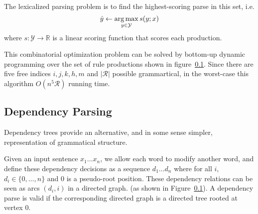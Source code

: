 \documentclass[11pt,letterpaper]{article}
\DeclareMathOperator*{\argmax}{arg\,max}
\newcommand{\nonterms}{\mathcal{N}}
\newcommand{\rules}{\mathcal{R}}
\newcommand{\terms}{\mathcal{T}}
\newcommand{\Span}[1]{\langle #1 \rangle}
\newcommand{\Reals}{\mathbb{R}}
\begin{document}



The lexicalized parsing problem is to find the highest-scoring parse in this set, i.e.  \[ \hat{y} \gets \argmax_{y \in {\cal Y}} s(y;x) \] where
$s: \mathcal{Y} \rightarrow \Reals$ is a linear scoring function that scores each production.

This combinatorial optimization problem can be solved by bottom-up dynamic
programming over the set of rule productions shown in figure~\ref{}.
Since there are five free indices $i, j,  k, h, m$ and $|\rules|$ possible grammartical, in the worst-case this algorithm
 $O(n^5 \rules)$ running time.












\subsection{Dependency Parsing}

Dependency trees provide an alternative, and in some sense simpler,
representation of grammatical structure.

Given an input sentence $x_1
\ldots x_n$, we allow each word to modify another word,  and define these dependency decisions as a sequence $d_1 \ldots d_n$ where for all $i$, $d_i \in \{0, \ldots, n\}$ and $0$ is a pseudo-root position. These dependency relations can be seen as arcs $(d_i, i)$ in a directed graph. (as
shown in Figure~\ref{}). A dependency parse is valid  if the corresponding directed graph is a directed tree rooted at
vertex $0$.
\end{document}
